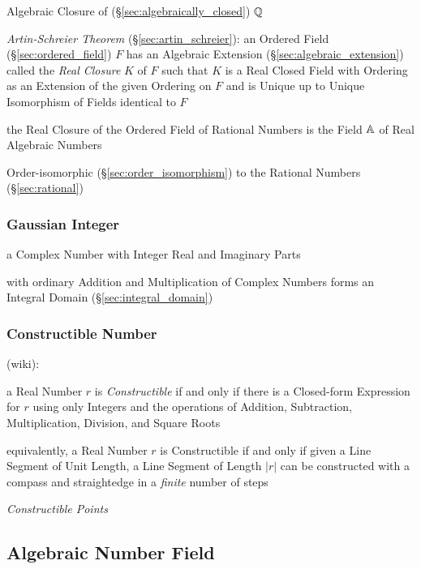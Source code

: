 Algebraic Closure of (\S\ref{sec:algebraically_closed}) $\mathbb{Q}$

\emph{Artin-Schreier Theorem} (\S\ref{sec:artin_schreier}):
an Ordered Field (\S\ref{sec:ordered_field}) $F$ has an Algebraic Extension
(\S\ref{sec:algebraic_extension}) called the \emph{Real Closure} $K$ of $F$
such that $K$ is a Real Closed Field with Ordering as an Extension of the given
Ordering on $F$ and is Unique up to Unique Isomorphism of Fields identical to
$F$

the Real Closure of the Ordered Field of Rational Numbers is the Field
$\mathbb{A}$ of Real Algebraic Numbers

Order-isomorphic (\S\ref{sec:order_isomorphism}) to the Rational
Numbers (\S\ref{sec:rational})



\subsubsection{Gaussian Integer}\label{sec:gaussian_integer}\hfill

a Complex Number with Integer Real and Imaginary Parts

with ordinary Addition and Multiplication of Complex Numbers forms an Integral
Domain (\S\ref{sec:integral_domain})



\subsubsection{Constructible Number}\label{sec:constructible_number}\hfill

(wiki):

a Real Number $r$ is \emph{Constructible} if and only if there is a Closed-form
Expression for $r$ using only Integers and the operations of Addition,
Subtraction, Multiplication, Division, and Square Roots

equivalently, a Real Number $r$ is Constructible if and only if given a Line
Segment of Unit Length, a Line Segment of Length $|r|$ can be constructed with a
compass and straightedge in a \emph{finite} number of steps

\emph{Constructible Points}



\subsection{Algebraic Number Field}\label{sec:number_field}


